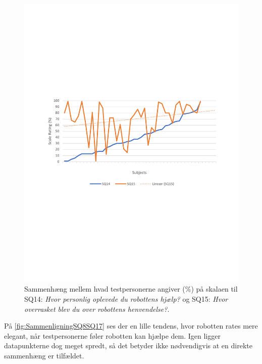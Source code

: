%
\begin{figure}[H]
	\centering
	\includegraphics[width=\textwidth]{Figure/Korrelationsgrafer/SQ14+SQ15}
	\caption{Sammenhæng mellem hvad testpersonerne angiver (\%) på skalaen til SQ14: \textit{Hvor personlig oplevede du robottens hjælp?} og SQ15: \textit{Hvor overrasket blev du over robottens henvendelse?}.}
	\label{fig:SammenligningSQ14SQ15}
\end{figure}
\noindent
%
På \autoref{fig:SammenligningSQ8SQ17} ses der en lille tendens, hvor robotten rates mere elegant, når testpersonerne føler robotten kan hjælpe dem. Igen ligger datapunkterne dog meget spredt, så det betyder ikke nødvendigvis at en direkte sammenhæng er tilfældet. 
%
